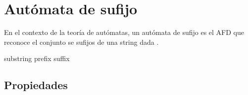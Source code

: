 \section{Autómata de sufijo}\label{SuffixAutomaton}
En el contexto de la teoría de autómatas, un autómata de sufijo es el \acrshort{AFD} que reconoce el conjunto se sufijos de una \gls{string} dada \cite{wiki:Suffix_automaton}.

\gls{substring}
\gls{prefix}
\gls{suffix}

\subsection{Propiedades}


